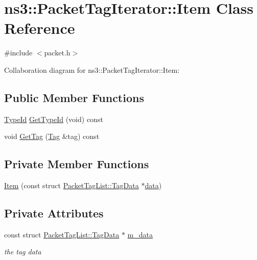 \hypertarget{classns3_1_1PacketTagIterator_1_1Item}{}\section{ns3\+:\+:Packet\+Tag\+Iterator\+:\+:Item Class Reference}
\label{classns3_1_1PacketTagIterator_1_1Item}


{\ttfamily \#include $<$packet.\+h$>$}



Collaboration diagram for ns3\+:\+:Packet\+Tag\+Iterator\+:\+:Item\+:
\subsection*{Public Member Functions}
\begin{DoxyCompactItemize}
\item 
\hyperlink{classns3_1_1TypeId}{Type\+Id} \hyperlink{classns3_1_1PacketTagIterator_1_1Item_a673f4e4aa0f673c77c248e04acef74ba}{Get\+Type\+Id} (void) const 
\item 
void \hyperlink{classns3_1_1PacketTagIterator_1_1Item_ad40cb067213ccac56be950f9b53a0d8c}{Get\+Tag} (\hyperlink{classns3_1_1Tag}{Tag} \&tag) const 
\end{DoxyCompactItemize}
\subsection*{Private Member Functions}
\begin{DoxyCompactItemize}
\item 
\hyperlink{classns3_1_1PacketTagIterator_1_1Item_ab782440590ec13abed215abad328ec24}{Item} (const struct \hyperlink{structns3_1_1PacketTagList_1_1TagData}{Packet\+Tag\+List\+::\+Tag\+Data} $\ast$\hyperlink{topology-example-sim_8cc_a26c65296e316af77b787dc77469bb2a4}{data})
\end{DoxyCompactItemize}
\subsection*{Private Attributes}
\begin{DoxyCompactItemize}
\item 
const struct \hyperlink{structns3_1_1PacketTagList_1_1TagData}{Packet\+Tag\+List\+::\+Tag\+Data} $\ast$ \hyperlink{classns3_1_1PacketTagIterator_1_1Item_a75b96e08083595ffe4bf71d57a73a197}{m\+\_\+data}
\begin{DoxyCompactList}\small\item\em the tag data \end{DoxyCompactList}\end{DoxyCompactItemize}
